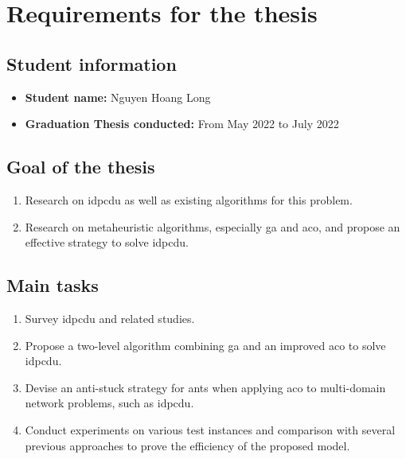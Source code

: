 \chapter*{Requirements for the thesis}
\section*{Student information}

\begin{itemize}
\item \textbf{Student name:} Nguyen Hoang Long
\item \textbf{Graduation Thesis conducted:} From May 2022 to July 2022
\end{itemize}
\section*{Goal of the thesis}
\begin{enumerate}
	\item Research on \gls{idpcdu} as well as existing algorithms for this problem.
	\item Research on metaheuristic algorithms, especially \gls{ga} and \gls{aco}, and propose an effective strategy to solve \gls{idpcdu}.
\end{enumerate}

\section*{Main tasks}
\begin{enumerate}
	\item Survey \acrfull{idpcdu} and related studies.
	\item Propose a two-level algorithm combining \gls{ga} and an improved \gls{aco} to solve \gls{idpcdu}.
	\item Devise an anti-stuck strategy for ants when applying \gls{aco} to multi-domain network problems, such as \gls{idpcdu}.
	\item Conduct experiments on various test instances and comparison with several previous approaches to prove the efficiency of the proposed model.
\end{enumerate}

